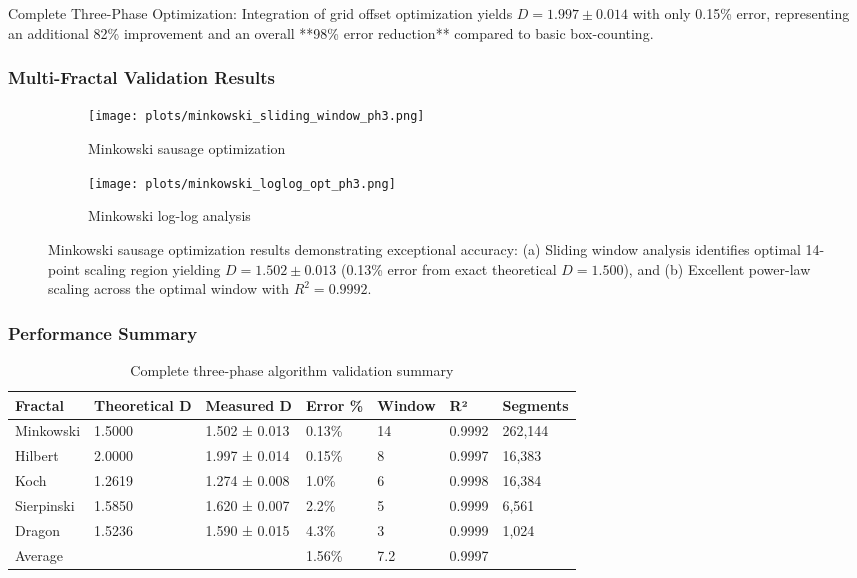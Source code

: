 \documentclass[preprint,12pt]{elsarticle}
\def\textbf#1{#1}%
\begin{document}
\textbf{Complete Three-Phase Optimization}: Integration of grid offset optimization yields $D = 1.997 \pm 0.014$ with only 0.15\% error, representing an additional 82\% improvement and an overall **98\% error reduction** compared to basic box-counting.

\subsubsection{Multi-Fractal Validation Results}

\begin{figure}[H]
\centering
\begin{subfigure}[b]{0.48\textwidth}
    \centering
    \texttt{[image: plots/minkowski\_sliding\_window\_ph3.png]}
    \caption{Minkowski sausage optimization}
    \label{fig:minkowski_optimized}
\end{subfigure}
\hfill
\begin{subfigure}[b]{0.48\textwidth}
    \centering
    \texttt{[image: plots/minkowski\_loglog\_opt\_ph3.png]}
    \caption{Minkowski log-log analysis}
    \label{fig:minkowski_loglog}
\end{subfigure}
\caption{Minkowski sausage optimization results demonstrating exceptional accuracy: (a) Sliding window analysis identifies optimal 14-point scaling region yielding $D = 1.502 \pm 0.013$ (0.13\% error from exact theoretical $D = 1.500$), and (b) Excellent power-law scaling across the optimal window with $R^2 = 0.9992$.}
\label{fig:minkowski_results}
\end{figure}

\subsubsection{Performance Summary}

\begin{table}[H]
\centering
\footnotesize
\begin{tabularx}{\textwidth}{@{}lXXXXXX@{}}
\toprule
\textbf{Fractal} & \textbf{Theoretical D} & \textbf{Measured D} & \textbf{Error \%} & \textbf{Window} & \textbf{R²} & \textbf{Segments} \\
\midrule
Minkowski & 1.5000 & 1.502 ± 0.013 & \textbf{0.13\%} & 14 & 0.9992 & 262,144 \\
Hilbert & 2.0000 & 1.997 ± 0.014 & \textbf{0.15\%} & 8 & 0.9997 & 16,383 \\
Koch & 1.2619 & 1.274 ± 0.008 & \textbf{1.0\%} & 6 & 0.9998 & 16,384 \\
Sierpinski & 1.5850 & 1.620 ± 0.007 & \textbf{2.2\%} & 5 & 0.9999 & 6,561 \\
Dragon & 1.5236 & 1.590 ± 0.015 & \textbf{4.3\%} & 3 & 0.9999 & 1,024 \\
\midrule
\textbf{Average} & & & \textbf{1.56\%} & \textbf{7.2} & \textbf{0.9997} & \\
\bottomrule
\end{tabularx}
\caption{Complete three-phase algorithm validation summary}
\label{tab:complete_validation}
\end{table}
\end{document}
